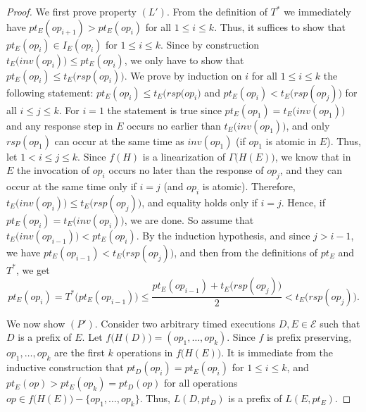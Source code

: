 \documentclass[11pt,letterpaper]{article}
\newcommand{\EE}{\mathcal{E}}
\begin{document}
\begin{proof}
  We first prove property $(L')$.
  From the definition of $T^\ast$ we immediately have $pt_E(op_{i+1})>pt_E(op_i)$ for all $1\leq i\leq k$.
  Thus, it suffices to show that $pt_E(op_i)\in I_{E}(op_i)$ for $1\leq i\leq k$.
  Since by construction $t_E\bigl(inv(op_i)\bigr)\leq pt_E(op_i)$, we only have to show that $pt_E(op_i)\leq t_E\bigl(rsp(op_i)\bigr)$.
  We prove by induction on $i$ for all $1\leq i\leq k$ the following statement:
  $pt_E(op_i)\leq t_E\bigl(rsp(op_i\bigr)$ and $pt_E(op_i)< t_E\bigl(rsp(op_j)\bigr)$ for all $i\leq j\leq k$.
  For $i=1$ the statement is true since $pt_E(op_1)=t_E\bigl(inv(op_1)\bigr)$ and any response step in $E$ occurs no earlier than $t_E\bigl(inv(op_1)\bigr)$, and only $rsp(op_1)$ can occur at the same time as $inv(op_1)$ (if $op_1$ is atomic in $E$).
  Thus, let $1<i\leq j\leq k$.
  Since $f(H)$ is a linearization of $\Gamma\bigl(H(E)\bigr)$, we know that in $E$ the invocation of $op_i$ occurs no later than the response of $op_j$, and they can occur at the same time only if $i=j$ (and $op_i$ is atomic).
  Therefore, $t_E\bigl(inv(op_i)\bigr)\leq t_E\bigl(rsp(op_j)\bigr)$, and equality holds only if $i=j$.
  Hence, if $pt_E(op_i)=t_E\bigl(inv(op_i)\bigr)$, we are done.
  So assume that $t_E\bigl(inv(op_{i-1})\bigr)<pt_E(op_i)$.
  By the induction hypothesis, and since $j>i-1$, we have $pt_E(op_{i-1})< t_E\bigl(rsp(op_j)\bigr)$, and then from the definitions of $pt_E$ and $T^\ast$, we get
  \begin{displaymath}
  pt_E(op_i)
  =
  T^\ast\bigl(pt_E(op_{i-1})\bigr)
  \leq
  \frac{pt_E(op_{i-1})+t_E\bigl(rsp(op_j)\bigr)}{2}
  < t_E\bigl(rsp(op_j)\bigr).
  \end{displaymath}

  We now show $(P')$.
  Consider two arbitrary timed executions $D,E\in\EE$ such that $D$ is a prefix of $E$.
  Let $f\bigl(H(D)\bigr)=(op_1,\dots,op_k)$.
  Since $f$ is prefix preserving, $op_1,\dots,op_k$ are the first $k$ operations in $f\bigl(H(E)\bigr)$.
  It is immediate from the inductive construction that $pt_D(op_i)=pt_E(op_i)$ for $1\leq i\leq k$, and $pt_E(op)>pt_E(op_k)=pt_D(op)$ for all operations $op\in f\bigl(H(E)\bigr)-\{op_1,\dots,op_k\}$.
  Thus, $L(D,pt_D)$ is a prefix of $L(E,pt_E)$.
\end{proof}
\end{document}
